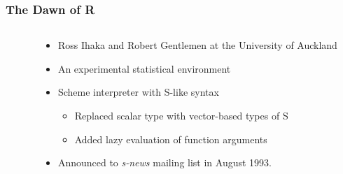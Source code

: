 \documentclass[svgnames]{beamer}
\begin{document}
\begin{frame}
  \frametitle{The Dawn of R}

  \begin{columns}
    \begin{column}{2.5cm}
    \end{column}
    \begin{column}{7.5cm}
      \begin{itemize}
      \item Ross Ihaka and Robert Gentlemen at the University of Auckland
      \item An experimental statistical environment
      \item Scheme interpreter with S-like syntax
        \begin{itemize}
        \item Replaced scalar type with vector-based types of S
        \item Added lazy evaluation of function arguments
        \end{itemize}
      \item Announced to {\em s-news} mailing list in August 1993.
      \end{itemize}
    \end{column}
  \end{columns}

\end{frame}
\end{document}
